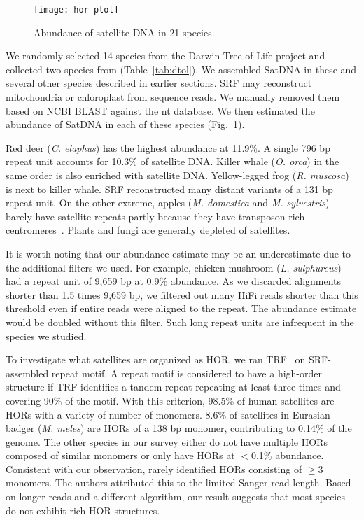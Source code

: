 \documentclass{bioinfo}
\begin{document}
\begin{figure}
\texttt{[image: hor-plot]}
\caption{Abundance of satellite DNA in 21 species.}\label{fig:dtol}
\end{figure}

We randomly selected 14 species from the Darwin Tree of Life project and
collected two species from \citet{Hon:2020aa} (Table~\ref{tab:dtol}). We assembled
SatDNA in these and several other species described in earlier sections.
SRF may reconstruct mitochondria or chloroplast from sequence reads.
We manually removed them based on NCBI BLAST against the nt database.
We then estimated the abundance of SatDNA in each of these species (Fig.~\ref{fig:dtol}).

Red deer (\emph{C. elaphus}) has the highest abundance at 11.9\%. A single
796 bp repeat unit accounts for 10.3\% of satellite DNA. Killer whale (\emph{O.
orca}) in the same order is also enriched with satellite DNA. Yellow-legged
frog (\emph{R. muscosa}) is next to killer whale. SRF reconstructed many
distant variants of a 131 bp repeat unit. On the other extreme, apples (\emph{M.
domestica} and \emph{M. sylvestris}) barely have satellite repeats partly
because they have transposon-rich centromeres~\citep{Zhang:2019ab}. Plants and
fungi are generally depleted of satellites.

It is worth noting that our abundance estimate may be an underestimate due to
the additional filters we used. For example, chicken mushroom (\emph{L.
sulphureus}) had a repeat unit of 9,659 bp at 0.9\% abundance. As we discarded
alignments shorter than 1.5 times 9,659 bp, we filtered out many HiFi reads
shorter than this threshold even if entire reads were aligned to the repeat.
The abundance estimate would be doubled without this filter. Such long repeat
units are infrequent in the species we studied.

To investigate what satellites are organized as HOR, we ran
TRF~\citep{Benson:1999aa} on SRF-assembled repeat motif. A repeat motif is
considered to have a high-order structure if TRF identifies a tandem repeat
repeating at least three times and covering 90\% of the motif. With this
criterion, 98.5\% of human satellites are HORs with a variety of number of
monomers. 8.6\% of satellites in Eurasian badger (\emph{M. meles}) are HORs of
a 138 bp monomer, contributing to 0.14\% of the genome. The other species in
our survey either do not have multiple HORs composed of similar monomers or
only have HORs at $<$0.1\% abundance. Consistent with our observation,
\citet{Melters:2013va} rarely identified HORs consisting of $\ge$3 monomers.
The authors attributed this to the limited Sanger read length. Based on longer
reads and a different algorithm, our result suggests that most species do not
exhibit rich HOR structures.
\end{document}
